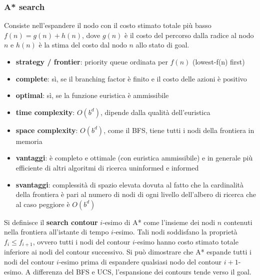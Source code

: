 \subsubsection*{A* search}
Consiste nell'espandere il nodo con il costo stimato totale più basso \(f(n) = g(n) + h(n)\), dove \(g(n)\) è il costo del
percorso dalla radice al nodo \(n\) e \(h(n)\) è la stima del costo dal nodo \(n\) allo stato di goal.
\begin{itemize}
	\item \textbf{strategy / frontier}: priority queue ordinata per \(f(n)\) (lowest-f(n) first)
	\item \textbf{complete}: sì, se il branching factor è finito e il costo delle azioni è positivo
	\item \textbf{optimal}: sì, se la funzione euristica è ammissibile
	\item \textbf{time complexity}: \(O(b^{d})\), dipende dalla qualità dell'euristica
	\item \textbf{space complexity}: \(O(b^{d})\), come il BFS, tiene tutti i nodi della frontiera in memoria
	\item \textbf{vantaggi}: è completo e ottimale (con euristica ammissibile) e in generale più efficiente di
	altri algoritmi di ricerca uninformed e informed
	\item \textbf{svantaggi}: complessità di spazio elevata dovuta al fatto che la cardinalità della frontiera
	è pari al numero di nodi di ogni livello dell'albero di ricerca che al caso peggiore è \(O(b^{d})\)
\end{itemize}
Si definisce il \textbf{search contour} \(i\)-esimo di A* come l'insieme dei nodi \(n\) contenuti nella frontiera all'istante
di tempo \(i\)-esimo. Tali nodi soddisfano la proprietà \(f_i \leq f_{i+1}\), ovvero tutti i nodi del contour \(i\)-esimo
hanno costo stimato totale inferiore ai nodi del contour successivo. Si può dimostrare che A* espande tutti i nodi del contour
\(i\)-esimo prima di espandere qualsiasi nodo del contour \(i+1\)-esimo.
A differenza del BFS e UCS, l'espansione dei contours tende verso il goal.

